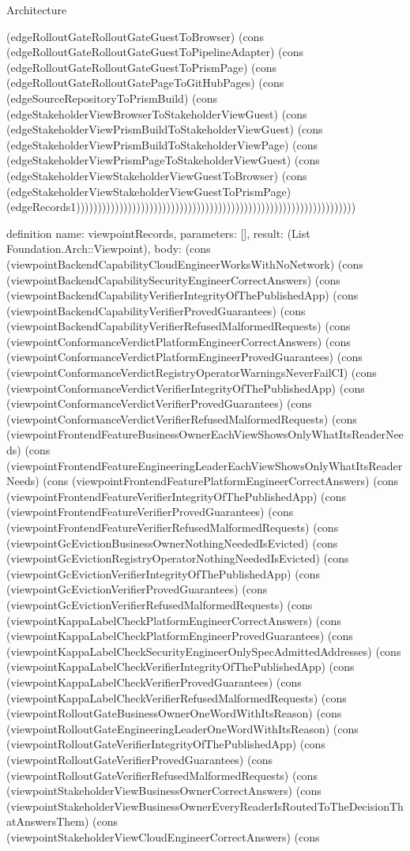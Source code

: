 \begin{lexlean}{Architecture}
\begin{semanticmodule}
{(edgeRolloutGateRolloutGateGuestToBrowser) (cons (edgeRolloutGateRolloutGateGuestToPipelineAdapter) (cons (edgeRolloutGateRolloutGateGuestToPrismPage) (cons (edgeRolloutGateRolloutGatePageToGitHubPages) (cons (edgeSourceRepositoryToPrismBuild) (cons (edgeStakeholderViewBrowserToStakeholderViewGuest) (cons (edgeStakeholderViewPrismBuildToStakeholderViewGuest) (cons (edgeStakeholderViewPrismBuildToStakeholderViewPage) (cons (edgeStakeholderViewPrismPageToStakeholderViewGuest) (cons (edgeStakeholderViewStakeholderViewGuestToBrowser) (cons (edgeStakeholderViewStakeholderViewGuestToPrismPage) (edgeRecords1)))))))))))))))))))))))))))))))))))))))))))))))))))))))))))))))))
}

definition{
  name: viewpointRecords,
  parameters: [],
  result: (List Foundation.Arch::Viewpoint),
  body: (cons (viewpointBackendCapabilityCloudEngineerWorksWithNoNetwork) (cons (viewpointBackendCapabilitySecurityEngineerCorrectAnswers) (cons (viewpointBackendCapabilityVerifierIntegrityOfThePublishedApp) (cons (viewpointBackendCapabilityVerifierProvedGuarantees) (cons (viewpointBackendCapabilityVerifierRefusedMalformedRequests) (cons (viewpointConformanceVerdictPlatformEngineerCorrectAnswers) (cons (viewpointConformanceVerdictPlatformEngineerProvedGuarantees) (cons (viewpointConformanceVerdictRegistryOperatorWarningsNeverFailCI) (cons (viewpointConformanceVerdictVerifierIntegrityOfThePublishedApp) (cons (viewpointConformanceVerdictVerifierProvedGuarantees) (cons (viewpointConformanceVerdictVerifierRefusedMalformedRequests) (cons (viewpointFrontendFeatureBusinessOwnerEachViewShowsOnlyWhatItsReaderNeeds) (cons (viewpointFrontendFeatureEngineeringLeaderEachViewShowsOnlyWhatItsReaderNeeds) (cons (viewpointFrontendFeaturePlatformEngineerCorrectAnswers) (cons (viewpointFrontendFeatureVerifierIntegrityOfThePublishedApp) (cons (viewpointFrontendFeatureVerifierProvedGuarantees) (cons (viewpointFrontendFeatureVerifierRefusedMalformedRequests) (cons (viewpointGcEvictionBusinessOwnerNothingNeededIsEvicted) (cons (viewpointGcEvictionRegistryOperatorNothingNeededIsEvicted) (cons (viewpointGcEvictionVerifierIntegrityOfThePublishedApp) (cons (viewpointGcEvictionVerifierProvedGuarantees) (cons (viewpointGcEvictionVerifierRefusedMalformedRequests) (cons (viewpointKappaLabelCheckPlatformEngineerCorrectAnswers) (cons (viewpointKappaLabelCheckPlatformEngineerProvedGuarantees) (cons (viewpointKappaLabelCheckSecurityEngineerOnlySpecAdmittedAddresses) (cons (viewpointKappaLabelCheckVerifierIntegrityOfThePublishedApp) (cons (viewpointKappaLabelCheckVerifierProvedGuarantees) (cons (viewpointKappaLabelCheckVerifierRefusedMalformedRequests) (cons (viewpointRolloutGateBusinessOwnerOneWordWithItsReason) (cons (viewpointRolloutGateEngineeringLeaderOneWordWithItsReason) (cons (viewpointRolloutGateVerifierIntegrityOfThePublishedApp) (cons (viewpointRolloutGateVerifierProvedGuarantees) (cons (viewpointRolloutGateVerifierRefusedMalformedRequests) (cons (viewpointStakeholderViewBusinessOwnerCorrectAnswers) (cons (viewpointStakeholderViewBusinessOwnerEveryReaderIsRoutedToTheDecisionThatAnswersThem) (cons (viewpointStakeholderViewCloudEngineerCorrectAnswers) (cons }
\end{semanticmodule}
\end{lexlean}
